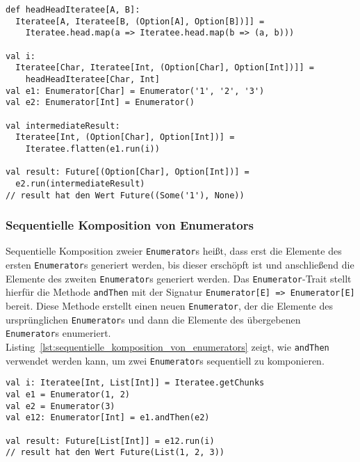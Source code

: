 \begin{lstlisting}[caption=Parallele Komposition von Iteratees mit mehreren Quellen auf eine Senke, label=lst:parallele_komposition_von_iteratees_mit_mehreren_quellen_auf_eine_senke]
def headHeadIteratee[A, B]:
  Iteratee[A, Iteratee[B, (Option[A], Option[B])]] =
    Iteratee.head.map(a => Iteratee.head.map(b => (a, b)))

val i:
  Iteratee[Char, Iteratee[Int, (Option[Char], Option[Int])]] =
    headHeadIteratee[Char, Int]
val e1: Enumerator[Char] = Enumerator('1', '2', '3')
val e2: Enumerator[Int] = Enumerator()

val intermediateResult:
  Iteratee[Int, (Option[Char], Option[Int])] =
    Iteratee.flatten(e1.run(i))

val result: Future[(Option[Char], Option[Int])] =
  e2.run(intermediateResult)
// result hat den Wert Future((Some('1'), None))
\end{lstlisting}


\subsubsection{Sequentielle Komposition von Enumerators} %
\label{ssub:anwendung_sequentielle_komposition_von_enumerators}

Sequentielle Komposition zweier \lstinline|Enumerator|s heißt, dass erst die Elemente des ersten \lstinline|Enumerator|s generiert werden, bis dieser erschöpft ist und anschließend die Elemente des zweiten \lstinline|Enumerator|s generiert werden.
Das \lstinline|Enumerator|-Trait stellt hierfür die Methode \lstinline|andThen| mit der Signatur \lstinline[breaklines=true]|Enumerator[E] => Enumerator[E]| bereit.
Diese Methode erstellt einen neuen \lstinline|Enumerator|, der die Elemente des ursprünglichen \lstinline|Enumerator|s und dann die Elemente des übergebenen \lstinline|Enumerator|s enumeriert.
Listing~\ref{lst:sequentielle_komposition_von_enumerators} zeigt, wie \lstinline|andThen| verwendet werden kann, um zwei \lstinline|Enumerator|s sequentiell zu komponieren.

\begin{lstlisting}[caption=Sequentielle Komposition von Enumerators, label=lst:sequentielle_komposition_von_enumerators]
val i: Iteratee[Int, List[Int]] = Iteratee.getChunks
val e1 = Enumerator(1, 2)
val e2 = Enumerator(3)
val e12: Enumerator[Int] = e1.andThen(e2)

val result: Future[List[Int]] = e12.run(i)
// result hat den Wert Future(List(1, 2, 3))
\end{lstlisting}

